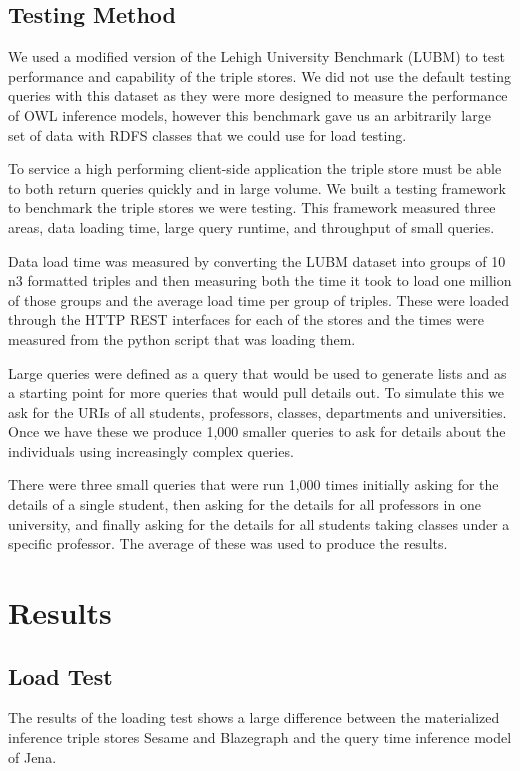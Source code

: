 \documentclass{llncs}
\begin{document}
\subsection{Testing Method}
We used a modified version of the Lehigh University Benchmark (LUBM) \cite{Guo2005} to test performance and capability of the triple stores.  We did not use the default testing queries with this dataset as they were more designed to measure the performance of OWL inference models, however this benchmark gave us an arbitrarily large set of data with RDFS classes that we could use for load testing.

To service a high performing client-side application the triple store must be able to both return queries quickly and in large volume.  We built a testing framework to benchmark the triple stores we were testing.  This framework measured three areas, data loading time, large query runtime, and throughput of small queries.

Data load time was measured by converting the LUBM dataset into groups of 10 n3 formatted triples and then measuring both the time it took to load one million of those groups and the average load time per group of triples.  These were loaded through the HTTP REST interfaces for each of the stores and the times were measured from the python script that was loading them.

Large queries were defined as a query that would be used to generate lists and as a starting point for more queries that would pull details out.  To simulate this we ask for the URIs of all students, professors, classes, departments and universities.  Once we have these we produce 1,000 smaller queries to ask for details about the individuals using increasingly complex queries.

There were three small queries that were run 1,000 times initially asking for the details of a single student, then asking for the details for all professors in one university, and finally asking for the details for all students taking classes under a specific professor.  The average of these was used to produce the results.


\section{Results}
\subsection{Load Test}
The results of the loading test shows a large difference between the materialized inference triple stores Sesame and Blazegraph and the query time inference model of Jena.
\end{document}
